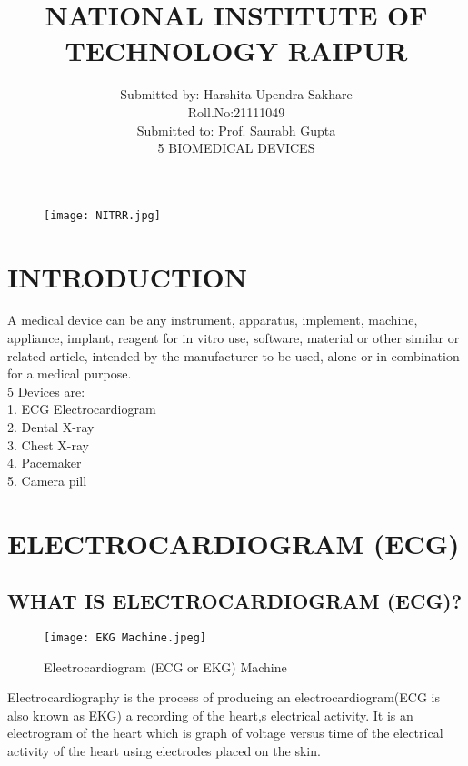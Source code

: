 \documentclass[12pt]{article}
\title{\Large NATIONAL INSTITUTE OF TECHNOLOGY RAIPUR}
\author{\large Submitted by: Harshita Upendra Sakhare\\Roll.No:21111049\\Submitted to: Prof. Saurabh Gupta\\5 BIOMEDICAL DEVICES}
\begin{document}
\begin{figure}
\centering
\texttt{[image: NITRR.jpg]}
\end{figure}

\maketitle
\tableofcontents
\clearpage








\section{INTRODUCTION}
{\large A medical device can be any instrument, apparatus, implement, machine, appliance, implant, reagent for in vitro use, software, material or other similar or related article, intended by the manufacturer to be used, alone or in combination for a medical purpose.\\


5 Devices are:\\
1. ECG Electrocardiogram\\2. Dental X-ray\\3. Chest X-ray\\4. Pacemaker\\5. Camera pill}



\section{ELECTROCARDIOGRAM (ECG)}




\subsection{WHAT IS ELECTROCARDIOGRAM (ECG)?}


\begin{figure}[h]
\centering
\texttt{[image: EKG Machine.jpeg]}
\caption{Electrocardiogram (ECG or EKG) Machine}
\end{figure}



{\large Electrocardiography is the process of producing an electrocardiogram(ECG is also known as EKG) a recording of the heart,s electrical activity. It is an electrogram of the heart which is graph of voltage versus time of the electrical activity of the heart using electrodes placed on the skin.}
\end{document}
